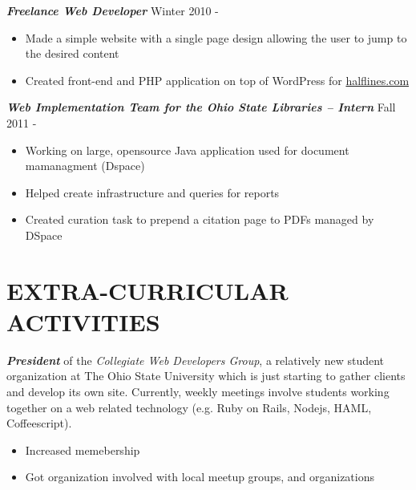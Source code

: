 \documentclass[line,margin=.2,letterpaper]{resume}
\begin{document}
\begin{resume}
    {\sl\textbf{Freelance Web Developer}} \hfill Winter 2010 - \\
    \vspace{-8pt}
    \begin{itemize}  
        \item Made a simple website with a single page design allowing the user
            to jump to the desired content
        \item Created front-end and PHP application on top of WordPress for
            \href{http://halflines.com/}{halflines.com}
    \end{itemize} 
    {\sl\textbf{Web Implementation Team for the Ohio State Libraries -- Intern}}
    \hfill Fall 2011 - \\
    \vspace{-8pt}
    \begin{itemize}  
        \item Working on large, opensource Java application used for document
            mamanagment (Dspace)
        \item Helped create infrastructure and queries for reports
        \item Created curation task to prepend a citation page to PDFs managed
            by DSpace
    \end{itemize} 

    \section{\uppercase{Extra-Curricular Activities}}             
    \emph{\textbf{President}} of the \emph{Collegiate Web Developers Group}, a
    relatively new student organization at The Ohio State University which is
    just starting to gather clients and develop its own site.  Currently, weekly
    meetings involve students working together on a web related technology (e.g.
    Ruby on Rails, Nodejs, HAML, Coffeescript).\\
    \vspace{-8pt}
    \begin{itemize}
        \item Increased memebership
        \item Got organization involved with local meetup groups, and
            organizations
    \end{itemize}

\end{resume}
\end{document}
